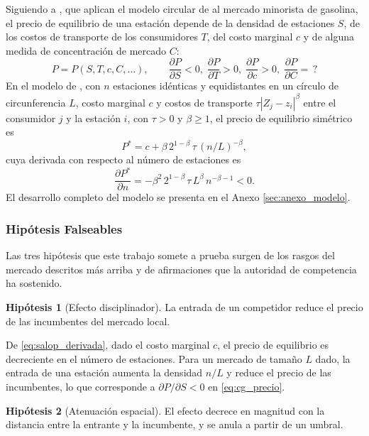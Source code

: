 Siguiendo a \textcite{CLEMENZGUGLER2006}, que aplican el modelo circular de \textcite{SALOP1979} al mercado minorista de gasolina, el precio de equilibrio de una estación depende de la densidad de estaciones $S$, de los costos de transporte de los consumidores $T$, del costo marginal $c$ y de alguna medida de concentración de mercado $C$:
\begin{equation}
    P = P(S, T, c, C, \ldots), \qquad \frac{\partial P}{\partial S} < 0,\; \frac{\partial P}{\partial T} > 0,\; \frac{\partial P}{\partial c} > 0,\; \frac{\partial P}{\partial C} = \,?
    \label{eq:cg_precio}
\end{equation}
En el modelo de \textcite{SALOP1979}, con $n$ estaciones idénticas y equidistantes en un círculo de circunferencia $L$, costo marginal $c$ y costos de transporte $\tau \left| Z_j - z_i \right|^{\beta}$ entre el consumidor $j$ y la estación $i$, con $\tau > 0$ y $\beta \geq 1$, el precio de equilibrio simétrico es
\begin{equation}
    P^{*} = c + \beta\, 2^{1-\beta}\, \tau\, (n/L)^{-\beta},
    \label{eq:salop_precio}
\end{equation}
cuya derivada con respecto al número de estaciones es
\begin{equation}
    \frac{\partial P^{*}}{\partial n} = -\beta^{2}\, 2^{1-\beta}\, \tau\, L^{\beta}\, n^{-\beta-1} < 0.
    \label{eq:salop_derivada}
\end{equation}
El desarrollo completo del modelo se presenta en el Anexo \ref{sec:anexo_modelo}.

\subsubsection*{Hipótesis Falseables}

Las tres hipótesis que este trabajo somete a prueba surgen de los rasgos del mercado descritos más arriba y de afirmaciones que la autoridad de competencia ha sostenido.

\textbf{Hipótesis 1} (Efecto disciplinador). La entrada de un competidor reduce el precio de
las incumbentes del mercado local.

De \eqref{eq:salop_derivada}, dado el costo marginal $c$, el precio de equilibrio es decreciente en el número de estaciones. Para un mercado de tamaño $L$ dado, la entrada de una estación aumenta la densidad $n/L$ y reduce el precio de las incumbentes, lo que corresponde a $\partial P / \partial S < 0$ en \eqref{eq:cg_precio}.

\textbf{Hipótesis 2} (Atenuación espacial). El efecto decrece en magnitud con la distancia entre
la entrante y la incumbente, y se anula a partir de un umbral.

